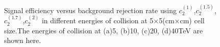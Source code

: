 \begin{figure}
\begin{center}

\end{center}
\caption{Signal efficiency versus background rejection rate using $c_2^{(1)}$,$c_2^{(1.5)}$,$c_2^{(1.7)}$,$c_2^{(2)}$ in different energies of collision at 5$\times$5(cm$\times$cm) cell size.The energies of collision at (a)5, (b)10, (c)20, (d)40TeV are shown here.}
\label{cluster_r009_c_variable}
\end{figure}

